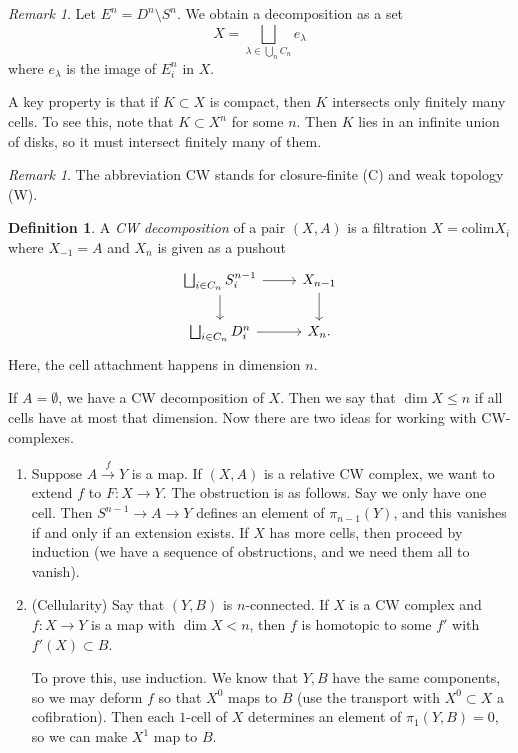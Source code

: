 \documentclass[leqno, openany]{memoir}
\theoremstyle{definition}
\newtheorem{defn}[thm]{Definition}
\theoremstyle{remark}
\newtheorem{rmk}[thm]{Remark}
\theoremstyle{plain}
\theoremstyle{definition}
\theoremstyle{remark}
\newcommand{\mr}[1]{\mathrm{#1}}
\begin{document}
\begin{rmk}
    Let $E^n = D^n \setminus S^n$. We obtain a decomposition as a set
    \[ X = \bigsqcup_{\lambda \in \bigcup_n C_n} e_{\lambda} \]
    where $e_{\lambda}$ is the image of $E_i^n$ in $X$.
\end{rmk}

A key property is that if $K \subset X$ is compact, then $K$ intersects only finitely many cells. To see this, note that $K \subset X^n$ for some $n$. Then $K$ lies in an infinite union of disks, so it must intersect finitely many of them.

\begin{rmk}
    The abbreviation CW stands for closure-finite (C) and weak topology (W).
\end{rmk}

\begin{defn}
    A \textit{CW decomposition} of a pair $(X,A)$ is a filtration $X = \mr{colim} X_i$ where $X_{-1} = A$ and $X_n$ is given as a pushout
    \begin{equation*}
    \begin{tikzcd}
        \bigsqcup_{i \in C_n} S_i^{n-1} \arrow{r} \arrow{d} & X_{n-1} \arrow{d} \\
        \bigsqcup_{i \in C_n} D_i^n \arrow{r} & X_n.
    \end{tikzcd}
    \end{equation*}
    Here, the cell attachment happens in dimension $n$.
\end{defn}

If $A = \emptyset$, we have a CW decomposition of $X$. Then we say that $\dim X \leq n$ if all cells have at most that dimension. Now there are two ideas for working with CW-complexes.

\begin{enumerate}
    \item Suppose $A \xrightarrow{f} Y$ is a map. If $(X,A)$ is a relative CW complex, we want to extend $f$ to $F \colon X \to Y$. The obstruction is as follows. Say we only have one cell. Then $S^{n-1} \to A \to Y$ defines an element of $\pi_{n-1}(Y)$, and this vanishes if and only if an extension exists. If $X$ has more cells, then proceed by induction (we have a sequence of obstructions, and we need them all to vanish).
    \item (Cellularity) Say that $(Y,B)$ is $n$-connected. If $X$ is a CW complex and $f \colon X \to Y$ is a map with $\dim X < n$, then $f$ is homotopic to some $f'$ with $f'(X) \subset B$.

        To prove this, use induction. We know that $Y,B$ have the same components, so we may deform $f$ so that $X^0$ maps to $B$ (use the transport with $X^0 \subset X$ a cofibration). Then each $1$-cell of $X$ determines an element of $\pi_1(Y,B) = 0$, so we can make $X^1$ map to $B$.
\end{enumerate}
\end{document}
